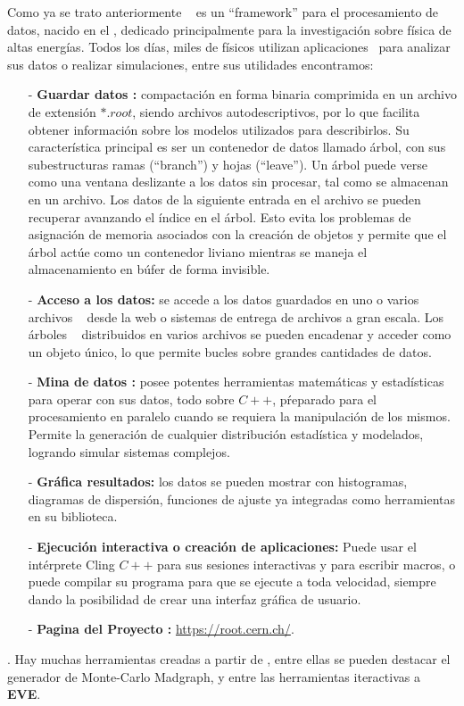 Como ya se trato anteriormente \ROOT ~ es un ``framework'' para el procesamiento de datos, nacido en el \CERN, dedicado principalmente para la investigación sobre física de altas energías. Todos los días, miles de físicos utilizan aplicaciones \ROOT ~para analizar sus datos o realizar simulaciones, entre sus utilidades encontramos:
\begin{itemize}
\item[-] \textbf{Guardar datos :} compactación en forma binaria comprimida en un archivo de extensión $*.root$, siendo archivos autodescriptivos, por lo que facilita obtener información sobre los modelos utilizados para describirlos. Su característica principal es ser un contenedor de datos llamado árbol, con sus subestructuras ramas (``branch'') y hojas (``leave''). Un árbol puede verse como una ventana deslizante a los datos sin procesar, tal como se almacenan en un archivo. Los datos de la siguiente entrada en el archivo se pueden recuperar avanzando el índice en el árbol. Esto evita los problemas de asignación de memoria asociados con la creación de objetos y permite que el árbol actúe como un contenedor liviano mientras se maneja el almacenamiento en búfer de forma invisible.

\item[-] \textbf{Acceso a los datos:} se accede a los datos guardados en uno o varios archivos \ROOT ~ desde la web o sistemas de entrega de archivos a gran escala. Los árboles \ROOT ~ distribuidos en varios archivos se pueden encadenar y acceder como un objeto único, lo que permite bucles sobre grandes cantidades de datos.

\item[-] \textbf{Mina de datos :} posee potentes herramientas matemáticas y estadísticas para operar con sus datos, todo sobre $C++$, pŕeparado para el procesamiento en paralelo cuando se requiera la manipulación de los mismos. Permite la generación de cualquier distribución estadística y modelados, logrando simular sistemas complejos.

\item[-] \textbf{Gráfica resultados:} los datos se pueden mostrar con histogramas, diagramas de dispersión, funciones de ajuste ya integradas como herramientas en su biblioteca.

\item[-] \textbf{Ejecución interactiva o creación de aplicaciones:} Puede usar el intérprete Cling $C++$ para sus sesiones interactivas y para escribir macros, o puede compilar su programa para que se ejecute a toda velocidad, siempre dando la posibilidad de crear una interfaz gráfica de usuario.

\item[-]  \textbf{Pagina del Proyecto :} \url{https://root.cern.ch/}.

\end{itemize}
 .
Hay muchas herramientas creadas a partir de \ROOT, entre ellas se pueden destacar el generador de Monte-Carlo Madgraph, y entre las herramientas iteractivas a \textbf{EVE}.


